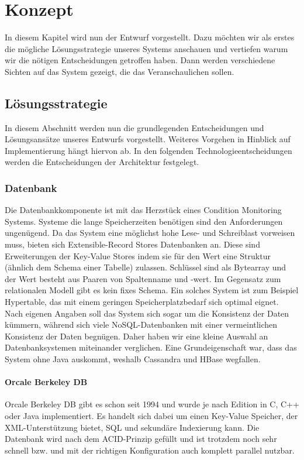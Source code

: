 \chapter{Konzept}
\label{ch:Konzept}
In diesem Kapitel wird nun der Entwurf vorgestellt. Dazu möchten wir als erstes die mögliche Lösungsstrategie unseres Systems anschauen und vertiefen warum wir die nötigen Entscheidungen getroffen haben. Dann werden verschiedene Sichten auf das System gezeigt, die das Veranschaulichen sollen.
\section{Lösungsstrategie}
In diesem Abschnitt werden nun die grundlegenden Entscheidungen und Lösungsansätze unseres Entwurfs vorgestellt. Weiteres Vorgehen in Hinblick auf Implementierung hängt hiervon ab.
In den folgenden Technologieentscheidungen werden die Entscheidungen der Architektur festgelegt.  
\subsection{Datenbank}
Die Datenbankkomponente ist mit das Herzstück eines Condition Monitoring Systems. Systeme die lange Speicherzeiten benötigen sind den Anforderungen ungenügend. Da das System eine möglichst hohe Lese- und Schreiblast vorweisen muss, bieten sich Extensible-Record Stores Datenbanken an. Diese sind Erweiterungen der Key-Value Stores indem sie für den Wert eine Struktur (ähnlich dem Schema einer Tabelle) zulassen. Schlüssel sind als Bytearray und der Wert besteht aus Paaren von Spaltenname und -wert. Im Gegensatz zum relationalen Modell gibt es kein fixes Schema. Ein solches System ist zum Beispiel Hypertable, das mit einem geringen Speicherplatzbedarf sich optimal eignet. Nach eigenen Angaben soll das System sich sogar um die Konsistenz der Daten kümmern, während sich viele NoSQL-Datenbanken mit einer vermeintlichen Konsistenz der Daten begnügen. Daher haben wir eine kleine Auswahl an Datenbanksystemen miteinander verglichen. Eine Grundeigenschaft war, dass das System ohne Java auskommt, weshalb Cassandra und HBase wegfallen.
\subsubsection{Orcale Berkeley DB}
Orcale Berkeley DB gibt es schon seit 1994 und wurde je nach Edition in C, C++ oder Java implementiert. Es handelt sich dabei um einen Key-Value Speicher, der XML-Unterstützung bietet, SQL und sekundäre Indexierung kann. Die Datenbank wird nach dem ACID-Prinzip gefüllt und ist trotzdem noch sehr schnell bzw. und mit der richtigen Konfiguration auch komplett parallel nutzbar.
